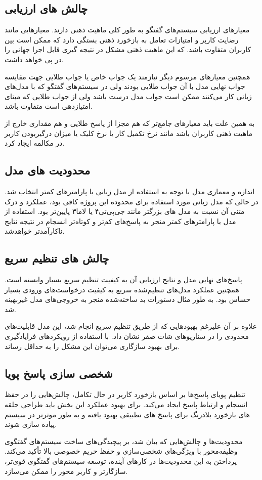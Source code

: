 \subsection{چالش های ارزیابی}
معیارهای ارزیابی سیستم‌های گفتگو به طور کلی ماهیت ذهنی دارند. معیارهایی مانند رضایت کاربر و امتیازات تعامل به بازخورد ذهنی بستگی دارد که ممکن است بین کاربران متفاوت باشد. که این ماهیت ذهنی مشکل در نتیجه گیری قابل اجرا جهانی را در پی خواهد داشت.

همچنین معیارهای مرسوم دیگر نیازمند یک جواب خاص یا جواب طلایی جهت مقایسه جواب نهایی مدل با آن جواب طلایی بودند ولی در سیستم‌های گفتگو که با مدل‌های زبانی کار می‌کنند ممکن است جواب مدل درست باشد ولی از جواب طلایی که مبنای امتیازدهی است متفاوت باشد.

به همین علت باید معیارهای جامع‌تر که هم مجزا از پاسخ طلایی و هم مقداری خارج از ماهیت ذهنی کاربران باشد مانند نرخ تکمیل کار یا نرخ کلیک یا میزان درگیربودن کاربر در مکالمه ایجاد کرد.

\subsection{محدودیت های مدل}
اندازه و معماری مدل با توجه به استفاده از مدل زبانی با پارامترهای کمتر انتخاب شد. در حالی که مدل زبانی مورد استفاده برای محدوده این پروژه کافی بود، عملکرد و درک متنی آن نسبت به مدل های بزرگتر مانند جی‌پی‌تی۴ یا لاما۳ پایین‌تر بود. استفاده از مدل با پارامترهای کمتر منجر به پاسخ‌های کم‌تر و کوتاه‌تر انسجام در نتیجه نتایج ناکارآمدتر خواهدشد.


\subsection{چالش های تنظیم سریع}
پاسخ‌های نهایی مدل و نتایج ارزیابی آن به کیفیت تنظیم سریع بسیار وابسته است. همچنین عملکرد مدل‌های تنظیم‌شده سریع به کیفیت درخواست‌های ورودی بسیار حساس بود. به طور مثال دستورات بد ساخته‌شده منجر به خروجی‌های مدل غیربهینه شد.

علاوه بر آن علیرغم بهبودهایی که از طریق تنظیم سریع انجام شد، این مدل قابلیت‌های محدودی را در سناریوهای شات صفر نشان داد. با استفاده از رویکردهای فرایادگیری برای بهبود سازگاری می‌توان این مشکل را به حداقل رساند.

\subsection{شخصی سازی پاسخ پویا}

تنظیم پویای پاسخ‌ها بر اساس بازخورد کاربر در حال تکامل، چالش‌هایی را در حفظ انسجام و ارتباط پاسخ ایجاد می‌کند.
برای بهبود عملکرد این بخش باید طراحی حلقه های بازخورد بلادرنگ برای پاسخ های تطبیقی بهبود یافته و به طور موثرتر در سیستم پیاده سازی شوند.

محدودیت‌ها و چالش‌هایی که بیان شد، بر پیچیدگی‌های ساخت سیستم‌های گفتگوی وظیفه‌محور با ویژگی‌های شخصی‌سازی و حفظ حریم خصوصی بالا تأکید می‌کند. پرداختن به این محدودیت‌ها در کارهای آینده، توسعه سیستم‌های گفتگوی قوی‌تر، سازگارتر و کاربر محور را ممکن می‌سازد.
